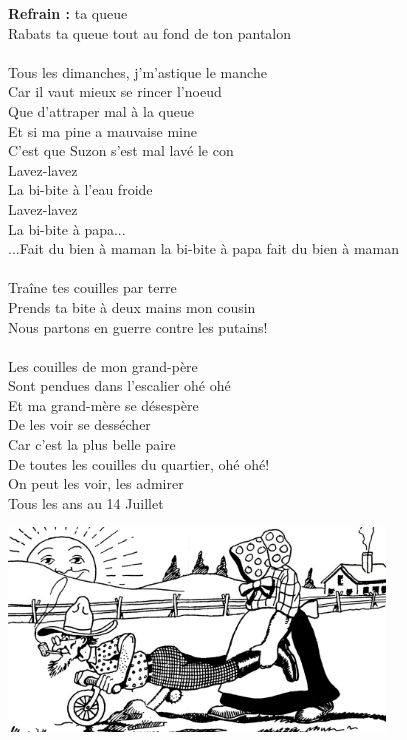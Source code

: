 
\textbf{Refrain :}
 ta queue
\\Rabats ta queue tout au fond de ton pantalon
\\\\Tous les dimanches, j'm'astique le manche
\\Car il vaut mieux se rincer l'noeud
\\Que d'attraper mal à la queue
\\Et si ma pine a mauvaise mine
\\C'est que Suzon s'est mal lavé le con
\\Lavez-lavez ~~~~~~~~~~~~~~~~~~~~~~~~~~~~~~~~\bissimple 
\\La bi-bite à l'eau froide
\\Lavez-lavez  ~~~~~~~~~~~~~~~~~~~~~~~~~~~~~~~~\bissimple 
\\La bi-bite à papa...
\\...Fait du bien à maman la bi-bite à papa fait du bien à maman
\\\\Traîne tes couilles par terre
\\Prends ta bite à deux mains mon cousin
\\Nous partons en guerre contre les putains!
\\\\Les couilles de mon grand-père
\\Sont pendues dans l'escalier ohé ohé
\\Et ma grand-mère se désespère
\\De les voir se dessécher
\\Car c'est la plus belle paire
\\De toutes les couilles du quartier, ohé ohé!
\\On peut les voir, les admirer 
\\Tous les ans au 14 Juillet
\\
\begin{center}
\includegraphics[width=0.75\textwidth]{images/couilles_grand_pere.jpg}
\end{center}

